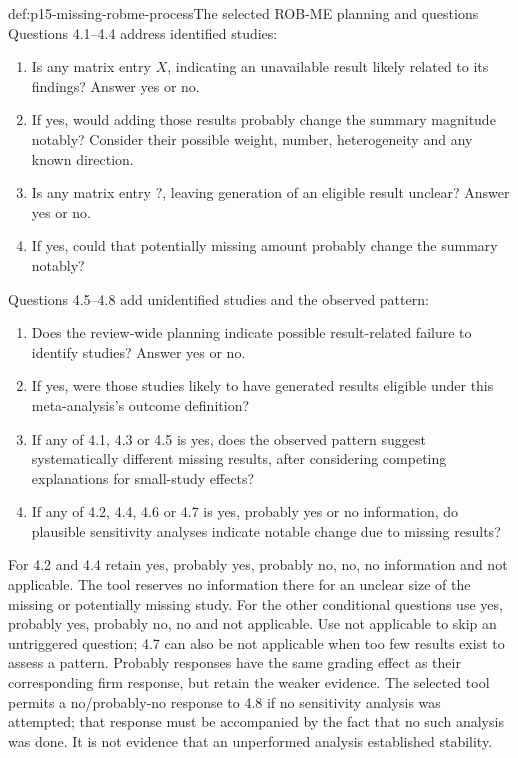 \begin{hbmethod}{def:p15-missing-robme-process}{The selected ROB-ME planning and questions}
Questions 4.1--4.4 address identified studies:
\begin{enumerate}
\item[4.1] Is any matrix entry \(X\), indicating an unavailable
             result likely related to its findings? Answer yes or no.
\item[4.2] If yes, would adding those results probably change the
             summary magnitude notably? Consider their possible weight,
             number, heterogeneity and any known direction.
\item[4.3] Is any matrix entry \(?\), leaving generation of an
             eligible result unclear? Answer yes or no.
\item[4.4] If yes, could that potentially missing amount probably
             change the summary notably?
\end{enumerate}
Questions 4.5--4.8 add unidentified studies and the observed pattern:
\begin{enumerate}
\item[4.5] Does the review-wide planning indicate possible
             result-related failure to identify studies? Answer yes or no.
\item[4.6] If yes, were those studies likely to have generated results
             eligible under this meta-analysis's outcome definition?
\item[4.7] If any of 4.1, 4.3 or 4.5 is yes, does the observed pattern
             suggest systematically different missing results, after
             considering competing explanations for small-study effects?
\item[4.8] If any of 4.2, 4.4, 4.6 or 4.7 is yes, probably yes or
             no information, do plausible sensitivity analyses indicate
             notable change due to missing results?
\end{enumerate}
For 4.2 and 4.4 retain yes, probably yes, probably no, no,
no information and not applicable. The tool reserves no information
there for an unclear size of the missing or potentially missing study.
For the other conditional questions use yes, probably yes, probably
no, no and not applicable. Use not applicable to skip an untriggered
question; 4.7 can also be not applicable when too few results exist
to assess a pattern. Probably responses have the same grading effect
as their corresponding firm response, but retain the weaker evidence.
The selected tool permits a no/probably-no response to 4.8 if no
sensitivity analysis was attempted; that response must be accompanied
by the fact that no such analysis was done. It is not evidence that
an unperformed analysis established stability.
\end{hbmethod}

